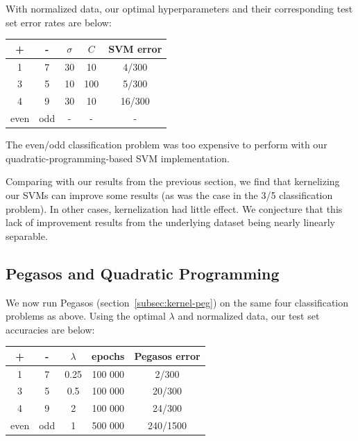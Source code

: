 \documentclass{article}
\begin{document}
\begin{multicols}{2}
With normalized data, our optimal hyperparameters
and their corresponding test set error rates are below:
\begin{center}
\begin{tabular}{|c|c|c|c|c|}
\hline
+ & - & $\sigma$ & $C$ & SVM error \\\hline
1 & 7 &30 & 10 & 4/300 \\
3 & 5 &10 & 100 & 5/300\\
4 & 9 & 30 & 10 & 16/300\\
even & odd & - & - & - \\\hline
\end{tabular}
\end{center}
The even/odd classification problem was
too expensive to perform
with our quadratic-programming-based SVM implementation.

Comparing with our results from the previous section,
we find that kernelizing our SVMs can improve some results
(as was the case in the 3/5 classification problem).
In other cases, kernelization had little effect.
We conjecture that this lack of improvement results from
the underlying dataset being nearly linearly separable.

\subsection{Pegasos and Quadratic Programming}

We now run Pegasos (section~\ref{subsec:kernel-peg})
on the same four classification problems as above.
Using the optimal $\lambda$ and normalized data, our test set accuracies
are below: 
\begin{center} 
\begin{tabular}{|c|c|c|c|c|}
\hline
+ & - & $\lambda$ & epochs & Pegasos error \\\hline
1 & 7 & 0.25 & 100 000 & 2/300 \\
3 & 5 & 0.5 & 100 000 & 20/300\\
4 & 9 & 2 & 100 000 & 24/300\\
even & odd & 1 & 500 000 & 240/1500 \\\hline
\end{tabular}
\end{center}


\end{multicols}
\end{document}
